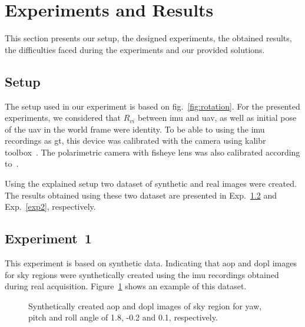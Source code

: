 \graphicspath{{./content/experiments/figures/}}

\section{Experiments and Results}
This section presents our setup, the designed experiments, the obtained
results, the difficulties faced during the experiments and our provided
solutions.

\subsection{Setup}
\label{sec:setup}
The setup used in our experiment is based on fig.~\ref{fig:rotation}.
For the presented experiments, we considered that $R_{vi}$ between \gls{imu} and
\gls{uav}, as well as initial pose of the \gls{uav} in the world frame were
identity.  To be able to using the \gls{imu} recordings as \gls{gt}, this device was
calibrated with the camera using kalibr toolbox~\cite{furgale2013unified,
  furgale2012continuous}. The polarimetric camera with fisheye lens was also
calibrated according to~\cite{kannala2006generic}.

Using the explained setup two dataset of synthetic and real images were
created. The results obtained using these two dataset are presented in
Exp.~\ref{exp1} and Exp.~\ref{exp2}, respectively.

\subsection{Experiment~1}
\label{exp1}
This experiment is based on synthetic data. Indicating that \gls{aop} and
\gls{dopl} images for sky regions were synthetically created using the \gls{imu}
recordings obtained during real acquisition. Figure~\ref{fig:aop-dop-syn} shows
an example of this dataset.

\begin{figure}
    \centering
    \hfill
    \label{fig:aop-syn}
    \label{fig:dop-syn}
    \hspace*{\fill}
    \caption{Synthetically created \gls{aop} and \gls{dopl} images of sky
      region for yaw, pitch and roll angle of 1.8, -0.2 and 0.1, respectively.}
    \label{fig:aop-dop-syn}
\end{figure}


